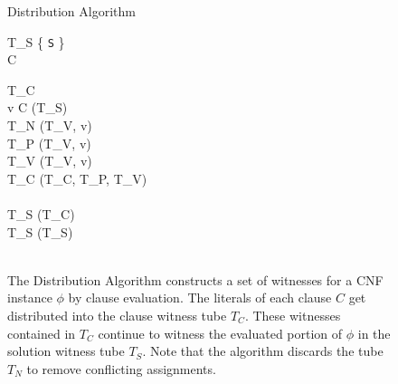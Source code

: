 
\begin{figure}[htbp]
	\renewcommand{\figurename}{Algorithm}
	\renewcommand{\thepseudocode}{\ref{distributionAlgorithm}}
	
	\begin{center}

	\begin{pseudocode}[shadowbox]{Distribution Algorithm}{\phi}
	
	T_S \GETS \{ \texttt{S} \} \\
	
	\FOREACH {} C  \phi \DO
		\BEGIN 
		
			T_C \GETS \emptyset \\
			\FOREACH {} v  C \DO
				\BEGIN
					[T_V, T_S] \GETS {}(T_S) \\
					T_N \GETS {}(T_V, \neg v)\\
					T_P \GETS {}(T_V, v)\\
					T_V \GETS {}(T_V, v)\\
					T_C \GETS {}(T_C, T_P, T_V)\\
				\END\\
				T_S \GETS {}(T_C)\\
				T_S \GETS {}(T_S)\\
		\END\\
	\end{pseudocode}

\caption{The {\sc Distribution Algorithm} constructs a set of witnesses for a CNF instance $\phi$ by clause evaluation.  The literals of each clause $C$ get distributed into the clause witness tube $T_C$.  These witnesses contained in $T_C$ continue to witness the evaluated portion of $\phi$ in the solution witness tube $T_S$.  Note that the algorithm discards the tube $T_N$ to remove conflicting assignments. }
\label{distributionAlgorithm}
\end{center}
\end{figure}

